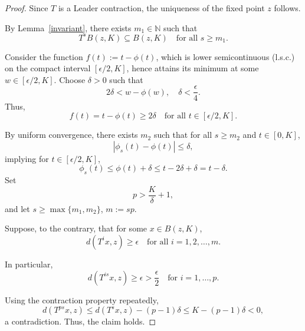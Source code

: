 \documentclass[10pt,a4paper]{amsart}
\begin{document}
\begin{proof}
Since \(T\) is a Leader contraction, the uniqueness of the fixed point \(z\) follows.

By Lemma~\ref{invariant}, there exists \(m_1 \in \mathbb{N}\) such that
\[
T^{s} B(z, K) \subseteq B(z, K) \quad \text{for all } s \geq m_1.
\]

Consider the function \(f(t) := t - \phi(t)\), which is lower semicontinuous (l.s.c.) on the compact interval \([\epsilon/2, K]\), hence attains its minimum at some \(w \in [\epsilon/2, K]\). Choose \(\delta > 0\) such that
\[
2\delta < w - \phi(w), \quad \delta < \frac{\epsilon}{4}.
\]
Thus,
\[
f(t) = t - \phi(t) \geq 2\delta \quad \text{for all } t \in [\epsilon/2, K].
\]

By uniform convergence, there exists \(m_2\) such that for all \(s \geq m_2\) and \(t \in [0, K]\),
\[
|\phi_s(t) - \phi(t)| \leq \delta,
\]
implying for \(t \in [\epsilon/2, K]\),
\[
\phi_s(t) \leq \phi(t) + \delta \leq t - 2\delta + \delta = t - \delta.
\]
Set
\[
p > \frac{K}{\delta} + 1,
\]
and let \(s \geq \max\{m_1, m_2\}\), \(m := s p\).

Suppose, to the contrary, that for some \(x \in B(z, K)\),
\[
d(T^{i} x, z) \geq \epsilon \quad \text{for all } i = 1, 2, \ldots, m.
\]

In particular,
\[
d(T^{i s} x, z) \geq \epsilon > \frac{\epsilon}{2} \quad \text{for } i = 1, \ldots, p.
\]

Using the contraction property repeatedly,
\[
d(T^{p s} x, z) \leq d(T^{s} x, z) - (p-1) \delta \leq K - (p-1) \delta < 0,
\]
a contradiction. Thus, the claim holds.
\end{proof}
\end{document}
